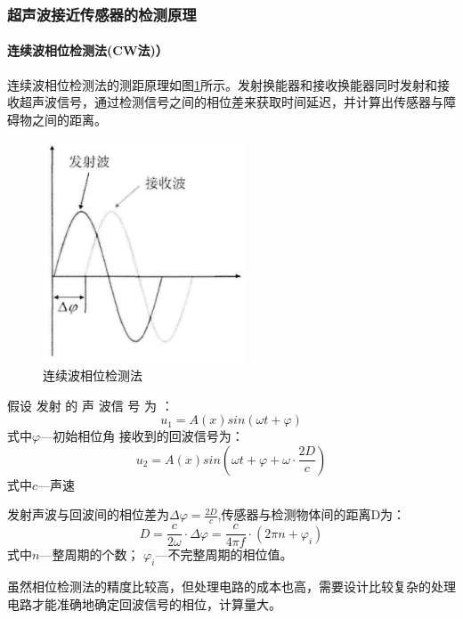     \subsubsection{超声波接近传感器的检测原理}
    \paragraph{连续波相位检测法(CW法)）}
    连续波相位检测法的测距原理如图\ref{连续波相位检测法}所示。发射换能器和接收换能器同时发射和接收超声波信号，通过检测信号之间的相位差来获取时间延迟，并计算出传感器与障碍物之间的距离。\par
    \begin{figure}[!h]
    	\centering
    	\includegraphics[width=6cm]{figure/连续波相位检测法.png}
    	\caption{连续波相位检测法}
    	\label{连续波相位检测法}
    \end{figure}\par


    假设 发射 的 声 波信 号 为 ：
    \begin{equation}
    	u_1=A(x)sin(\omega t + \varphi)
    \end{equation}
式中\quad$\varphi$---初始相位角
接收到的回波信号为：
\begin{equation}
	u_2=A(x)sin(\omega t + \varphi + \omega \cdot{\frac{2D}{c}})
\end{equation}
式中\quad$c$---声速\par
发射声波与回波间的相位差为$\Delta \varphi=\frac{2D}{c}$,传感器与检测物体间的距离D为：
\begin{equation}
	D=\frac{c}{2\omega}\cdot \Delta \varphi=\frac{c}{4\pi f}\cdot(2\pi n + \varphi_i)
\end{equation}
式中\quad$n$---整周期的个数；
\quad$\varphi_i$---不完整周期的相位值。\par
虽然相位检测法的精度比较高，但处理电路的成本也高，需要设计比较复杂的处理电路才能准确地确定回波信号的相位，计算量大。\par



